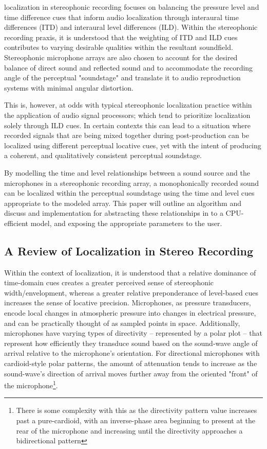  localization in stereophonic recording focuses on balancing the pressure level and time difference cues that inform audio localization through interaural time differences (ITD) and interaural level differences (ILD). Within the stereophonic recording praxis, it is understood that the weighting of ITD and ILD cues contributes to varying desirable qualities within the resultant soundfield. Stereophonic microphone arrays are also chosen to account for the desired balance of direct sound and reflected sound and to accommodate the recording angle of the perceptual "soundstage" and translate it to audio reproduction systems with minimal angular distortion.

This is, however, at odds with typical stereophonic localization practice within the application of audio signal processors; which tend to prioritize localization solely through ILD cues. In certain contexts this can lead to a situation where recorded signals that are being mixed together during post-production can be localized using different perceptual locative cues, yet with the intent of producing a coherent, and qualitatively consistent perceptual soundstage.

By modelling the time and level relationships between a sound source and the microphones in a stereophonic recording array, a monophonically recorded sound can be localized within the perceptual soundstage using the time and level cues appropriate to the modeled array. This paper will outline an algorithm and discuss and implementation for abstracting these relationships in to a CPU-efficient model, and exposing the appropriate parameters to the user.

\subsection{A Review of Localization in Stereo Recording}

Within the context of localization, it is understood that a relative dominance of time-domain cues creates a greater perceived sense of stereophonic width/envelopment, whereas a greater relative preponderance of level-based cues increases the sense of locative precision. Microphones, as pressure transducers, encode local changes in atmospheric pressure into changes in electrical pressure, and can be practically thought of as sampled points in space. Additionally, microphones have varying types of directivity -- represented by a polar plot -- that represent how efficiently they transduce sound based on the sound-wave angle of arrival relative to the microphone's orientation. For directional microphones with cardioid-style polar patterns, the amount of attenuation tends to increase as the sound-wave's direction of arrival moves further away from the oriented "front" of the microphone\footnote{There is some complexity with this as the directivity pattern value increases past a pure-cardioid, with an inverse-phase area beginning to present at the rear of the microphone and increasing until the directivity approaches a bidirectional pattern}.

